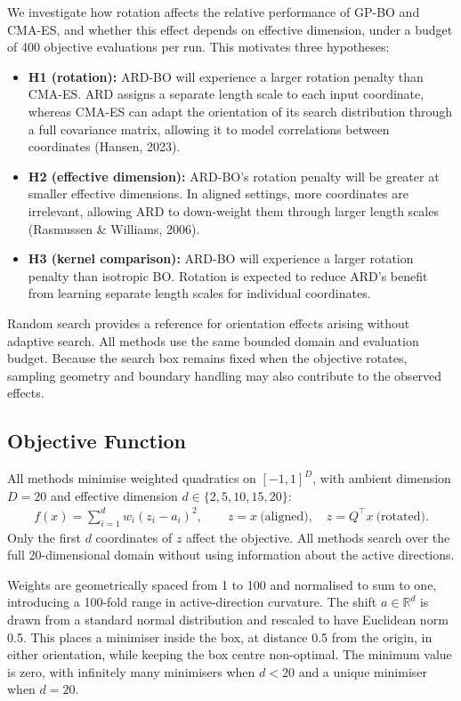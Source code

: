 \documentclass[11pt]{article}
\begin{document}
We investigate how rotation affects the relative performance of GP-BO and CMA-ES, and whether this effect depends on effective dimension, under a budget of 400 objective evaluations per run. This motivates three hypotheses:
\begin{itemize}
\item \textbf{H1 (rotation):} ARD-BO will experience a larger rotation penalty than CMA-ES. ARD assigns a separate length scale to each input coordinate, whereas CMA-ES can adapt the orientation of its search distribution through a full covariance matrix, allowing it to model correlations between coordinates (Hansen, 2023).
\item \textbf{H2 (effective dimension):} ARD-BO's rotation penalty will be greater at smaller effective dimensions. In aligned settings, more coordinates are irrelevant, allowing ARD to down-weight them through larger length scales (Rasmussen \& Williams, 2006).
\item \textbf{H3 (kernel comparison):} ARD-BO will experience a larger rotation penalty than isotropic BO. Rotation is expected to reduce ARD's benefit from learning separate length scales for individual coordinates.
\end{itemize}

Random search provides a reference for orientation effects arising without adaptive search. All methods use the same bounded domain and evaluation budget. Because the search box remains fixed when the objective rotates, sampling geometry and boundary handling may also contribute to the observed effects.

\subsection{Objective Function}

All methods minimise weighted quadratics on $[-1,1]^D$, with ambient dimension $D=20$ and effective dimension $d\in\{2,5,10,15,20\}$:
\begin{align}
\label{eq:objective}
f(x)=\sum_{i=1}^{d}w_i(z_i-a_i)^2,\qquad z=x\ \text{(aligned)},\quad z=Q^\top x\ \text{(rotated)}.
\end{align}
Only the first $d$ coordinates of $z$ affect the objective. All methods search over the full 20-dimensional domain without using information about the active directions.

Weights are geometrically spaced from 1 to 100 and normalised to sum to one, introducing a 100-fold range in active-direction curvature. The shift $a \in \mathbb{R}^d$ is drawn from a standard normal distribution and rescaled to have Euclidean norm 0.5. This places a minimiser inside the box, at distance 0.5 from the origin, in either orientation, while keeping the box centre non-optimal. The minimum value is zero, with infinitely many minimisers when $d < 20$ and a unique minimiser when $d = 20$.
\end{document}
